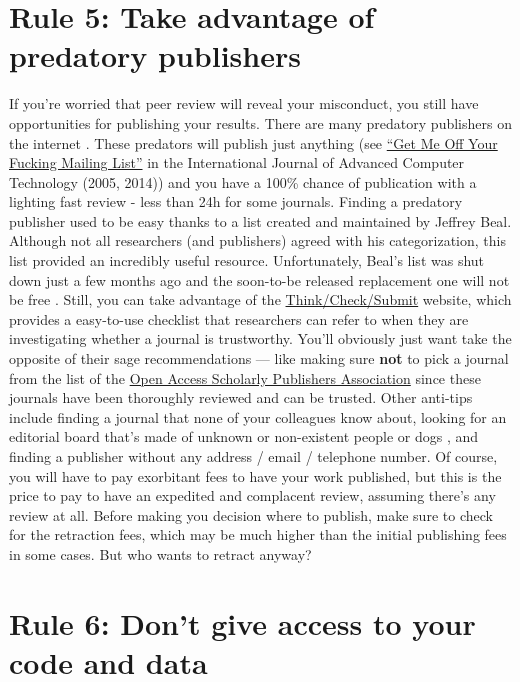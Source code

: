 \documentclass[11pt,letter]{article}
\providecommand\citep{\cite}
\begin{document}
\section*{Rule 5: Take advantage of predatory publishers}

If you're worried that peer review will reveal your misconduct, you still have opportunities for publishing your results. There are many predatory publishers on
the internet \citep{shen:2015}. These predators will
publish just anything
(see \href{https://en.wikipedia.org/wiki/International_Journal_of_Advanced_Computer_Technology#Publication_controversy}{``Get
  Me Off Your Fucking Mailing List''} in the International Journal of Advanced
Computer Technology (2005, 2014)) and you have a 100\% chance of publication with a lighting fast review - less than 24h for some
journals. Finding a predatory publisher used to be easy thanks to a list
created and maintained by Jeffrey Beal. Although not all researchers (and publishers)
agreed with his categorization, this list provided an incredibly useful resource. Unfortunately, Beal's list was shut down just a few months ago
\citep{straumsheim:2017} and the
soon-to-be released replacement one will not be free \citep{silver:2017}. Still,
you can take advantage of the
\href{http://thinkchecksubmit.org}{Think/Check/Submit} website, which provides a
easy-to-use checklist that researchers can refer to when they are investigating
whether a journal is trustworthy. You'll obviously just want take the opposite of their sage recommendations --- like making sure \textbf{not} to pick a journal from the list of the 
\href{https://oaspa.org}{Open Access Scholarly Publishers Association} since
these journals have been thoroughly reviewed and can be trusted. Other anti-tips include finding a journal that none of your colleagues know about, looking for an editorial board that's made of
unknown or non-existent people \citep{sorokowski:2017} or dogs \citep{kennedy:2017}, and finding a publisher without any address / email / telephone number. Of course, you
will have to pay exorbitant fees to have your work published, but this is the
price to pay to have an expedited and complacent review, assuming there's any review at
all. Before making you decision where to publish, make sure to check
for the retraction fees, which may be much higher than the initial publishing
fees in some cases. But who wants to retract anyway?

\section*{Rule 6: Don't give access to your code and data}
\end{document}
